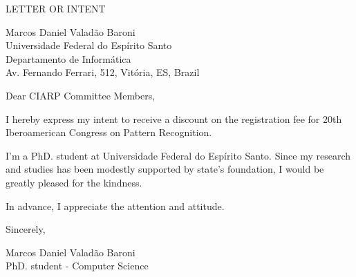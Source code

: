 \documentclass[a4paper]{letter}
\begin{document}
\begin{letter}{}

\begin{center}
{\LARGE LETTER OR INTENT}
\end{center}

\vspace{8mm}

\date{August 13, 2015}

\begin{flushleft}

Marcos Daniel Valad\~ao Baroni\\
Universidade Federal do Esp\'irito Santo\\
Departamento de Inform\'atica\\
Av. Fernando Ferrari, 512, Vit\'oria, ES, Brazil
\end{flushleft}


\opening{Dear CIARP Committee Members,}

I hereby express my intent to receive a discount on the registration fee for 20th Iberoamerican Congress on Pattern Recognition.

I'm a PhD. student at Universidade Federal do Esp\'irito Santo.
Since my research and studies has been modestly supported by state's foundation,
I would be greatly pleased for the kindness.

In advance, I appreciate the attention and attitude.

\vspace{8mm}

Sincerely,

\vspace{10mm}

Marcos Daniel Valad\~ao Baroni\\
PhD. student - Computer Science

\end{letter}
\end{document}
